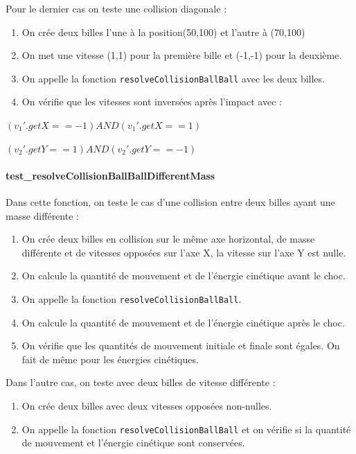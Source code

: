 \documentclass{report}
\begin{document}
Pour le dernier cas on teste une collision diagonale :

\begin{enumerate}
\item On crée deux billes l’une à la position(50,100) et l’autre à (70,100)
\item On met une vitesse (1,1) pour la première bille et (-1,-1) pour la deuxième.
\item On appelle la fonction \texttt{resolveCollisionBallBall} avec les deux billes.
\item On vérifie que les vitesses sont inversées après l’impact avec :
\end{enumerate}
 
\((v_1'.getX == -1) AND (v_1'.getX == 1)\)

\((v_2'.getY == 1) AND (v_2'.getY == -1)\)

\paragraph{test\_resolveCollisionBallBallDifferentMass}

Dans cette fonction, on teste le cas d’une collision entre deux billes ayant une masse différente :

\begin{enumerate}
\item On crée deux billes en collision sur le même axe horizontal, de masse différente et de vitesses opposées sur l’axe X, la vitesse sur l’axe Y est nulle.
\item On calcule la quantité de mouvement et de l’énergie cinétique avant le choc.
\item On appelle la fonction \texttt{resolveCollisionBallBall}.
\item On calcule la quantité de mouvement et de l’énergie cinétique après le choc.
\item On vérifie que les quantités de mouvement initiale et finale sont égales. On fait de même pour les énergies cinétiques.\\
\end{enumerate}

Dans l’autre cas, on teste avec deux billes de vitesse différente :

\begin{enumerate}
\item On crée deux billes avec deux vitesses opposées non-nulles.
\item On appelle la fonction \texttt{resolveCollisionBallBall} et on vérifie si la quantité de mouvement et l’énergie cinétique sont conservées.\\
\end{enumerate}
\end{document}
